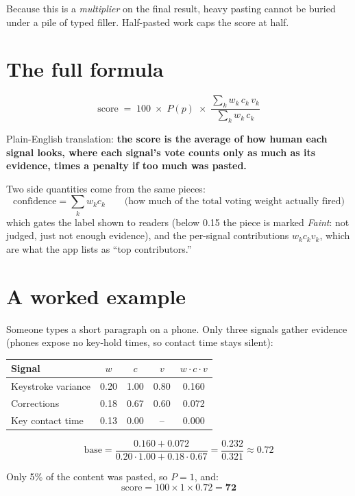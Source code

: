 \documentclass[11pt,a4paper]{article}
\begin{document}
Because this is a \emph{multiplier} on the final result, heavy pasting cannot be buried under a pile of typed filler. Half-pasted work caps the score at half.

\section{The full formula}

\[
\boxed{\;\text{score} \;=\; 100 \;\times\; P(p) \;\times\; \frac{\sum_k w_k \, c_k \, v_k}{\sum_k w_k \, c_k}\;}
\]

Plain-English translation: \textbf{the score is the average of how human each signal looks, where each signal's vote counts only as much as its evidence, times a penalty if too much was pasted.}

Two side quantities come from the same pieces:
\[
\text{confidence} = \sum_k w_k c_k
\qquad\text{(how much of the total voting weight actually fired)}
\]
which gates the label shown to readers (below 0.15 the piece is marked \emph{Faint}: not judged, just not enough evidence), and the per-signal contributions $w_k c_k v_k$, which are what the app lists as ``top contributors.''

\section{A worked example}

Someone types a short paragraph on a phone. Only three signals gather evidence (phones expose no key-hold times, so contact time stays silent):

\begin{center}
\begin{tabular}{lcccc}
\toprule
\textbf{Signal} & $w$ & $c$ & $v$ & $w \cdot c \cdot v$ \\
\midrule
Keystroke variance & 0.20 & 1.00 & 0.80 & 0.160 \\
Corrections        & 0.18 & 0.67 & 0.60 & 0.072 \\
Key contact time   & 0.13 & 0.00 & --   & 0.000 \\
\bottomrule
\end{tabular}
\end{center}

\[
\text{base} = \frac{0.160 + 0.072}{0.20 \cdot 1.00 + 0.18 \cdot 0.67} = \frac{0.232}{0.321} \approx 0.72
\]

Only 5\% of the content was pasted, so $P = 1$, and:
\[
\text{score} = 100 \times 1 \times 0.72 = \mathbf{72}
\]
\end{document}
